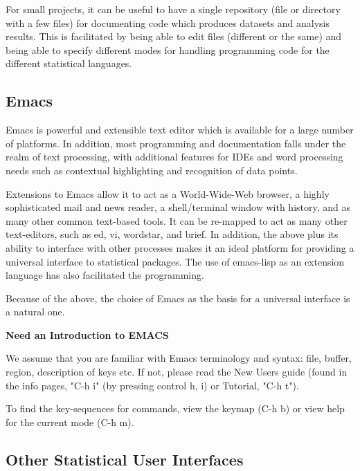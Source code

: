 \documentclass{article}
\begin{document}
For small projects, it can be useful to have a single repository (file
or directory with a few files) for documenting code which produces
datasets and analysis results.  This is facilitated by being able to
edit files (different or the same) and being able to specify different
modes for handling programming code for the different statistical
languages.


\subsection{Emacs}
\label{sec:intro:emacs}

Emacs is powerful and extensible text editor which is
available for a large number of platforms.  In addition, most
programming and documentation falls under the realm of text
processing, with additional features for IDEs and word processing
needs such as contextual highlighting and recognition of data points.

Extensions to Emacs allow it to act as a World-Wide-Web browser, a
highly sophisticated mail and news reader, a shell/terminal window
with history, and as many other common text-based tools.  It can be
re-mapped to act as many other text-editors, such as ed, vi, wordstar,
and brief.  In addition, the above plus its ability to interface with
other processes makes it an ideal platform for providing a universal
interface to statistical packages.  The use of emacs-lisp as an
extension language has also facilitated the programming.

Because of the above, the choice of Emacs as the basis for a universal
interface is a natural one.  

\textbf{Need an Introduction to EMACS}

We assume that you are familiar with Emacs terminology and syntax:
file, buffer, region, description of keys etc.  If not, please read
the New Users guide (found in the info pages, "C-h i" (by pressing
control h, i) or Tutorial, "C-h t").

To find the key-sequences for commands, view the keymap (C-h b) or
view help for the current mode (C-h m).



\subsection{Other Statistical User Interfaces}
\label{sec:intro:UI}
\end{document}

